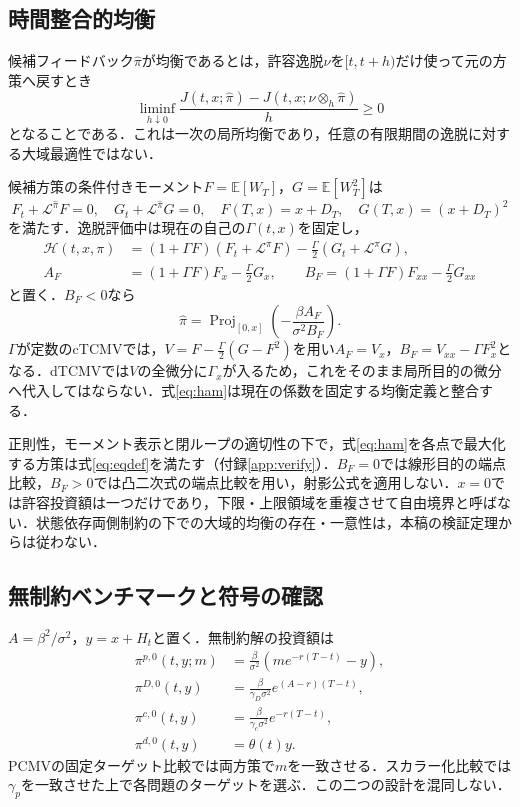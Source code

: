 \documentclass[10pt,a4paper]{article}
\numberwithin{equation}{section}
\numberwithin{table}{section}
\numberwithin{figure}{section}
\theoremstyle{plain}
\theoremstyle{definition}
\newcommand{\E}{\mathbb{E}}
\DeclareMathOperator{\Proj}{Proj}
\begin{document}
\subsection{時間整合的均衡}
候補フィードバック$\hat\pi$が均衡であるとは，許容逸脱$\nu$を$[t,t+h)$だけ使って元の方策へ戻すとき
\begin{equation}
\liminf_{h\downarrow0}\frac{J(t,x;\hat\pi)-J(t,x;\nu\otimes_h\hat\pi)}h\geq0
\label{eq:eqdef}
\end{equation}
となることである．これは一次の局所均衡であり，任意の有限期間の逸脱に対する大域最適性ではない．

候補方策の条件付きモーメント$F=\E[W_T]$，$G=\E[W_T^2]$は
\begin{equation}
F_t+\mathcal L^{\hat\pi}F=0,\quad G_t+\mathcal L^{\hat\pi}G=0,
\quad F(T,x)=x+D_T,\quad G(T,x)=(x+D_T)^2
\label{eq:FG}
\end{equation}
を満たす．逸脱評価中は現在の自己の$\Gamma(t,x)$を固定し，
\begin{align}
\mathcal H(t,x,\pi)&=(1+\Gamma F)(F_t+\mathcal L^\pi F)-\frac\Gamma2(G_t+\mathcal L^\pi G),\label{eq:ham}\\
A_F&=(1+\Gamma F)F_x-\frac\Gamma2G_x,\qquad
B_F=(1+\Gamma F)F_{xx}-\frac\Gamma2G_{xx}
\label{eq:AB}
\end{align}
と置く．$B_F<0$なら
\begin{equation}
\hat\pi=\Proj_{[0,x]}\left(-\frac{\beta A_F}{\sigma^2B_F}\right).
\label{eq:eqproj}
\end{equation}
$\Gamma$が定数のcTCMVでは，$V=F-\tfrac\Gamma2(G-F^2)$を用い$A_F=V_x$，$B_F=V_{xx}-\Gamma F_x^2$となる．dTCMVでは$V$の全微分に$\Gamma_x$が入るため，これをそのまま局所目的の微分へ代入してはならない．式\eqref{eq:ham}は現在の係数を固定する均衡定義と整合する\citep{BjorkMurgociZhou2014,BjorkKhapkoMurgoci2017}．

正則性，モーメント表示と閉ループの適切性の下で，式\eqref{eq:ham}を各点で最大化する方策は式\eqref{eq:eqdef}を満たす（付録\ref{app:verify}）．$B_F=0$では線形目的の端点比較，$B_F>0$では凸二次式の端点比較を用い，射影公式を適用しない．$x=0$では許容投資額は一つだけであり，下限・上限領域を重複させて自由境界と呼ばない．状態依存両側制約の下での大域的均衡の存在・一意性は，本稿の検証定理からは従わない．

\subsection{無制約ベンチマークと符号の確認}
\label{sec:theta}
$A=\beta^2/\sigma^2$，$y=x+H_t$と置く．無制約解の投資額は
\begin{align}
\pi^{p,0}(t,y;m)&=\frac\beta{\sigma^2}(me^{-r(T-t)}-y),\label{eq:uncp}\\
\pi^{D,0}(t,y)&=\frac\beta{\gamma_D\sigma^2}e^{(A-r)(T-t)},\label{eq:uncD}\\
\pi^{c,0}(t,y)&=\frac\beta{\gamma_c\sigma^2}e^{-r(T-t)},\label{eq:uncc}\\
\pi^{d,0}(t,y)&=\theta(t)y.
\label{eq:uncd}
\end{align}
PCMVの固定ターゲット比較では両方策で$m$を一致させる．スカラー化比較では$\gamma_p$を一致させた上で各問題のターゲットを選ぶ．この二つの設計を混同しない．
\end{document}
